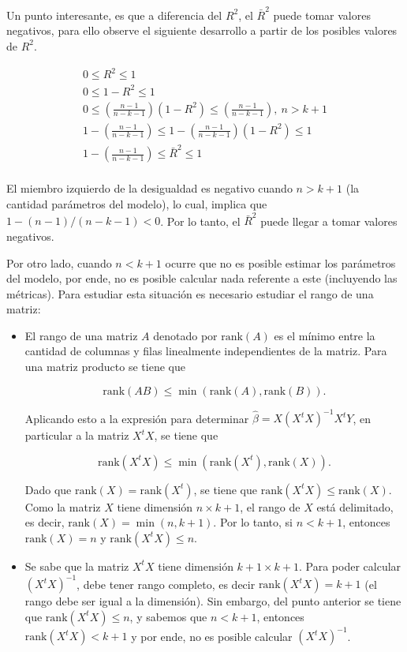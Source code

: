 \documentclass[
  11pt,
]{book}
\theoremstyle{definition}
\theoremstyle{definition}
\theoremstyle{definition}
\theoremstyle{definition}
\theoremstyle{remark}
\begin{document}
Un punto interesante, es que a diferencia del \(R^2\), el \(\bar{R}^2\) puede tomar valores negativos, para ello observe el siguiente desarrollo a partir de los posibles valores de \(R^2\).

\begin{gather*}
0 \leq R^2 \leq 1\\
0 \leq 1 - R^2 \leq 1\\
0 \leq \left( \frac{n-1}{n-k-1} \right) (1 - R^2) \leq \left( \frac{n-1}{n-k-1} \right), \ n > k+1\\
1 - \left( \frac{n-1}{n-k-1} \right) \leq 1 - \left( \frac{n-1}{n-k-1} \right) (1 - R^2) \leq 1\\
1 - \left( \frac{n-1}{n-k-1} \right) \leq \bar{R}^2 \leq 1\\
\label{eq:igualacion-modelos5}
\end{gather*}

El miembro izquierdo de la desigualdad es negativo cuando \(n > k+1\) (la cantidad parámetros del modelo), lo cual, implica que \(1-(n-1)/(n-k-1) < 0\). Por lo tanto, el \(\bar{R}^2\) puede llegar a tomar valores negativos.

Por otro lado, cuando \(n < k+1\) ocurre que no es posible estimar los parámetros del modelo, por ende, no es posible calcular nada referente a este (incluyendo las métricas). Para estudiar esta situación es necesario estudiar el rango de una matriz:

\begin{itemize}
\item
  El rango de una matriz \(A\) denotado por \(\text{rank}(A)\) es el mínimo entre la cantidad de columnas y filas linealmente independientes de la matriz. Para una matriz producto se tiene que

  \[\text{rank}(AB) \leq \min(\text{rank}(A), \text{rank}(B)).\]

  Aplicando esto a la expresión para determinar \(\widehat{\beta} = X(X^tX)^{-1}X^tY\), en particular a la matriz \(X^tX\), se tiene que

  \[\text{rank}(X^tX) \leq \min(\text{rank}(X^t), \text{rank}(X)).\]

  Dado que \(\text{rank}(X) = \text{rank}(X^t)\), se tiene que \(\text{rank}(X^tX) \leq \text{rank}(X)\). Como la matriz \(X\) tiene dimensión \(n \times k+1\), el rango de \(X\) está delimitado, es decir, \(\text{rank}(X) = \min(n,k+1)\). Por lo tanto, si \(n < k+1\), entonces \(\text{rank}(X) = n\) y \(\text{rank}(X^tX) \leq n\).
\item
  Se sabe que la matriz \(X^tX\) tiene dimensión \(k+1 \times k+1\). Para poder calcular \((X^tX)^{-1}\), debe tener rango completo, es decir \(\text{rank}(X^tX) = k+1\) (el rango debe ser igual a la dimensión). Sin embargo, del punto anterior se tiene que \(\text{rank}(X^tX) \leq n\), y sabemos que \(n < k+1\), entonces \(\text{rank}(X^tX) < k+1\) y por ende, no es posible calcular \((X^tX)^{-1}\).
\end{itemize}
\end{document}
